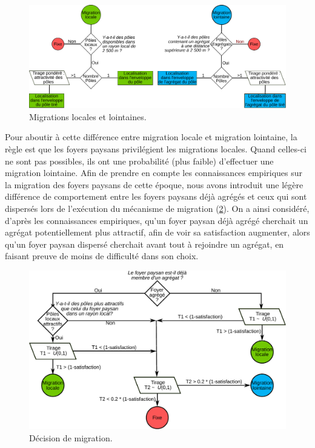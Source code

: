 \begin{figure}[H]
\centering
\includegraphics[width=1\linewidth]{img/migration_locale-lointaine.pdf}
\caption{Migrations locales et lointaines.}
\label{fig:migrations-locales-lointaines}
\end{figure}
Pour aboutir à cette différence entre migration locale et migration lointaine, la règle est que les foyers paysans privilégient les migrations locales.
Quand celles-ci ne sont pas possibles, ils ont une probabilité (plus faible) d'effectuer une migration lointaine.
Afin de prendre en compte les connaissances empiriques sur la migration des foyers paysans de cette époque, nous avons introduit une légère différence de comportement entre les foyers paysans déjà agrégés et ceux qui sont dispersés lors de l'exécution du mécanisme de migration (\cref{fig:choix-migration}).
On a ainsi considéré, d'après les connaissances empiriques, qu'un foyer paysan déjà agrégé cherchait un agrégat potentiellement plus attractif, afin de voir sa satisfaction augmenter, alors qu'un foyer paysan dispersé cherchait avant tout à rejoindre un agrégat, en faisant preuve de moins de difficulté dans son choix.

\begin{figure}[H]
	\centering
	\includegraphics[width=0.9\linewidth]{img/choix_migration.pdf}
	\caption{Décision de migration.}
	\label{fig:choix-migration}
\end{figure}

